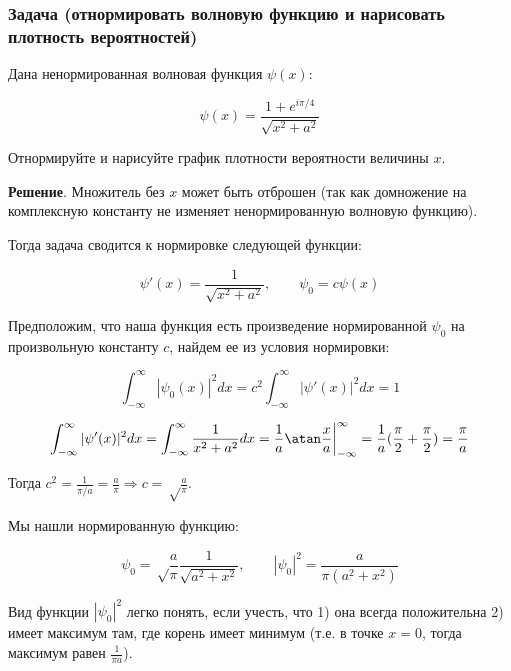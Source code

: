 \subsubsection{Задача (отнормировать волновую функцию и нарисовать плотность вероятностей)}\hypertarget{section-3}{}\label{section-3}

Дана ненормированная волновая функция $\psi(x)$:

\begin{displaymath}
\psi(x)=\frac{1+e^{i\pi/4}}{\sqrt{x^2+a^2}}
\end{displaymath}

Отнормируйте и нарисуйте график плотности вероятности величины $x$.

\textbf{Решение}. Множитель без \guillemotleft{}$x$\guillemotright{} может быть отброшен (так как домножение на комплексную константу не изменяет ненормированную волновую функцию). 

Тогда задача сводится к нормировке следующей функции:

\begin{displaymath}
\psi'(x)=\frac{1}{\sqrt{x^2+a^2}},\qquad \psi_0=c\psi(x)
\end{displaymath}

Предположим, что наша функция есть произведение нормированной $\psi_0$ на произвольную константу $c$, найдем ее из условия нормировки:

\begin{displaymath}
\int_{-\infty}^{\infty}|\psi_0(x)|^2 dx=
c^2\int_{-\infty}^{\infty}|\psi'(x)|^2 dx=1
\end{displaymath}

\begin{displaymath}
\int_{-\infty}^{\infty}|\psi'(x)|^2 dx=
\int_{-\infty}^{\infty} \frac{1}{x^2+a^2} dx= \frac{1}{a}\atan\frac{x}{a}\bigg|_{-\infty}^{\infty}=
\frac{1}{a}(\frac\pi2+\frac\pi2)=\frac{\pi}{a}
\end{displaymath}

Тогда  $c^2=\frac{1}{\pi/a}=\frac{a}{\pi} \Rightarrow c=\sqrt\frac{a}{\pi}$.

Мы нашли нормированную функцию:

\begin{displaymath}
\psi_0=\sqrt\frac{a}{\pi}\frac{1}{\sqrt{a^2+x^2}},\qquad
|\psi_0|^2=\frac{a}{\pi(a^2+x^2)}
\end{displaymath}

Вид функции $|\psi_0|^2$ легко понять,  если учесть, что 1) она всегда положительна 2) имеет максимум там, где корень имеет минимум (т.е. в точке $x=0$, тогда максимум равен $\frac{1}{\pi a}$).

